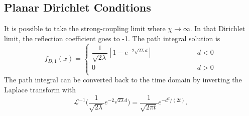 

\subsection{Planar Dirichlet Conditions}

It is possible to take the strong-coupling limit where $\chi\rightarrow \infty$. 
In that Dirichlet limit, the reflection coefficient goes to -1.
The path integral solution is
\begin{equation}
  f_{D,1}(x) = \left\{\begin{array}{lcr} 
      \dfrac{1}{\sqrt{2\lambda}}\left[1 - e^{-2\sqrt{2\lambda}d}\right]  & \hspace{2cm} & d<0\\
      0 & \hspace{2cm} & d>0\\
    \end{array} \right. 
\end{equation}
The path integral can be converted back to the time domain by inverting the Laplace transform with
\begin{equation}
  \mathcal{L}^{-1}\bigg(\frac{1}{\sqrt{2\lambda}}e^{-2\sqrt{2\lambda}d}\bigg) 
  = \frac{1}{\sqrt{2\pi t}}e^{-d^2/(2t)}.\label{eq:Laplace_Gaussian}
\end{equation}


